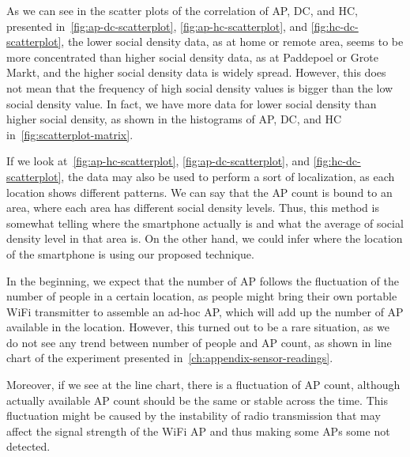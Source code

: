 As we can see in the scatter plots of the correlation of \ac{AP}, \ac{DC}, and \ac{HC}, presented in~\autoref{fig:ap-dc-scatterplot}, \autoref{fig:ap-hc-scatterplot}, and \autoref{fig:hc-dc-scatterplot}, the lower social density data, as at home or remote area, seems to be more concentrated than higher social density data, as at Paddepoel or Grote Markt, and the higher social density data is widely spread. However, this does not mean that the frequency of high social density values is bigger than the low social density value. In fact, we have more data for lower social density than higher social density, as shown in the histograms of \ac{AP}, \ac{DC}, and \ac{HC} in~\autoref{fig:scatterplot-matrix}.

If we look at~\autoref{fig:ap-hc-scatterplot}, \autoref{fig:ap-dc-scatterplot}, and \autoref{fig:hc-dc-scatterplot}, the data may also be used to perform a sort of localization, as each location shows different patterns. We can say that the \ac{AP} count is bound to an area, where each area has different social density levels. Thus, this method is somewhat telling where the smartphone actually is and what the average of social density level in that area is. On the other hand, we could infer where the location of the smartphone is using our proposed technique.

In the beginning, we expect that the number of \ac{AP} follows the fluctuation of the number of people in a certain location, as people might bring their own portable WiFi transmitter to assemble an ad-hoc \ac{AP}, which will add up the number of \ac{AP} available in the location. However, this turned out to be a rare situation, as we do not see any trend between number of people and \ac{AP} count, as shown in line chart of the experiment presented in~\autoref{ch:appendix-sensor-readings}.

Moreover, if we see at the line chart, there is a fluctuation of \ac{AP} count, although actually available \ac{AP} count should be the same or stable across the time. This fluctuation might be caused by the instability of radio transmission that may affect the signal strength of the WiFi \ac{AP} and thus making some \ac{AP}s some not detected.


